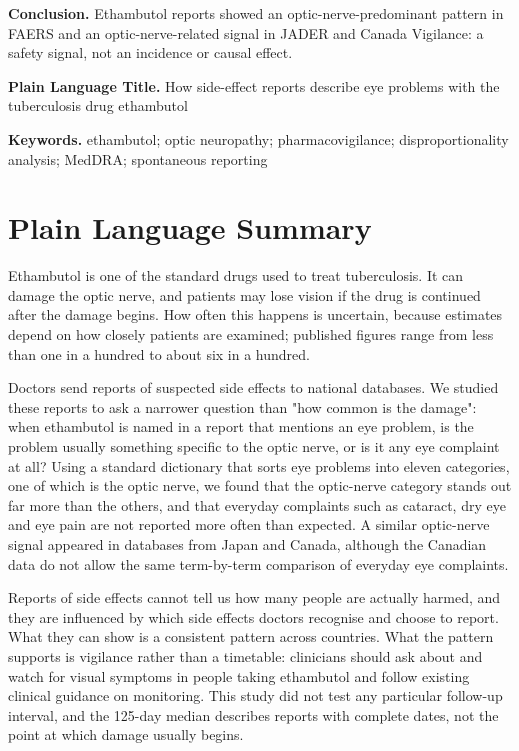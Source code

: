 \documentclass[12pt,a4paper]{article}
\begin{document}
\textbf{Conclusion.} Ethambutol reports showed an optic-nerve-predominant pattern in FAERS and an optic-nerve-related signal in JADER and Canada Vigilance: a safety signal, not an incidence or causal effect.

\textbf{Plain Language Title.} How side-effect reports describe eye problems with the tuberculosis drug ethambutol

\textbf{Keywords.} ethambutol; optic neuropathy; pharmacovigilance; disproportionality analysis; MedDRA; spontaneous reporting

\bigskip

\section*{Plain Language Summary}

Ethambutol is one of the standard drugs used to treat tuberculosis. It can damage the optic nerve, and patients may lose vision if the drug is continued after the damage begins. How often this happens is uncertain, because estimates depend on how closely patients are examined; published figures range from less than one in a hundred to about six in a hundred.

Doctors send reports of suspected side effects to national databases. We studied these reports to ask a narrower question than "how common is the damage": when ethambutol is named in a report that mentions an eye problem, is the problem usually something specific to the optic nerve, or is it any eye complaint at all? Using a standard dictionary that sorts eye problems into eleven categories, one of which is the optic nerve, we found that the optic-nerve category stands out far more than the others, and that everyday complaints such as cataract, dry eye and eye pain are not reported more often than expected. A similar optic-nerve signal appeared in databases from Japan and Canada, although the Canadian data do not allow the same term-by-term comparison of everyday eye complaints.

Reports of side effects cannot tell us how many people are actually harmed, and they are influenced by which side effects doctors recognise and choose to report. What they can show is a consistent pattern across countries. What the pattern supports is vigilance rather than a timetable: clinicians should ask about and watch for visual symptoms in people taking ethambutol and follow existing clinical guidance on monitoring. This study did not test any particular follow-up interval, and the 125-day median describes reports with complete dates, not the point at which damage usually begins.
\end{document}
